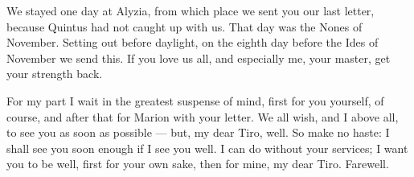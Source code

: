 

 We stayed one day at Alyzia, from which place we sent you our last letter, because Quintus had not caught up with us. That day was the Nones of November. Setting out before daylight, on the eighth day before the Ides of November we send this. If you love us all, and especially me, your master, get your strength back.

 For my part I wait in the greatest suspense of mind, first for you yourself, of course, and after that for Marion with your letter. We all wish, and I above all, to see you as soon as possible --- but, my dear Tiro, well. So make no haste: I shall see you soon enough if I see you well. I can do without your services; I want you to be well, first for your own sake, then for mine, my dear Tiro. Farewell.
